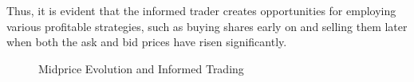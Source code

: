 Thus, it is evident that the informed trader creates opportunities for employing various profitable strategies, such as buying shares early on and selling them later when both the ask and bid prices have risen significantly.
\begin{figure}[!htbp]
    \centering
    \qquad
    \caption{Midprice Evolution and Informed Trading}
    \label{fig:empirical_midprice}
\end{figure}

